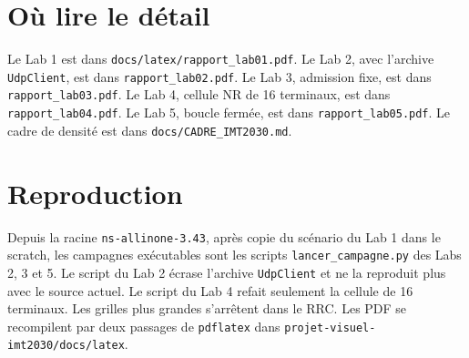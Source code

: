 \documentclass[11pt,a4paper]{article}
\begin{document}
\section{Où lire le détail}

Le Lab 1 est dans \texttt{docs/latex/rapport\_lab01.pdf}. Le Lab 2, avec l'archive \texttt{UdpClient}, est dans \texttt{rapport\_lab02.pdf}. Le Lab 3, admission fixe, est dans \texttt{rapport\_lab03.pdf}. Le Lab 4, cellule NR de 16 terminaux, est dans \texttt{rapport\_lab04.pdf}. Le Lab 5, boucle fermée, est dans \texttt{rapport\_lab05.pdf}. Le cadre de densité est dans \texttt{docs/CADRE\_IMT2030.md}.

\section{Reproduction}

Depuis la racine \texttt{ns-allinone-3.43}, après copie du scénario du Lab 1 dans le scratch, les campagnes exécutables sont les scripts \texttt{lancer\_campagne.py} des Labs 2, 3 et 5. Le script du Lab 2 écrase l'archive \texttt{UdpClient} et ne la reproduit plus avec le source actuel. Le script du Lab 4 refait seulement la cellule de 16 terminaux. Les grilles plus grandes s'arrêtent dans le RRC. Les PDF se recompilent par deux passages de \texttt{pdflatex} dans \texttt{projet-visuel-imt2030/docs/latex}.
\end{document}
